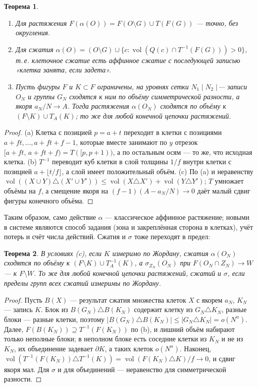 \documentclass[11pt,a4paper]{article}
\theoremstyle{plain}
\newtheorem{theorem}{Теорема}
\theoremstyle{definition}
\theoremstyle{remark}
\DeclareMathOperator{\vol}{vol}
\begin{document}
\begin{theorem}\label{thm:affine}
\begin{enumerate}[label=\upshape(\alph*)]
\item Для растяжения $F(\alpha(O))=F(O\setminus G)\cup T(F(G))$ — точно, без округления.
\item Для сжатия $\alpha(O)=(O\setminus G)\cup\{c: \vol(Q(c)\cap T^{-1}(F(G)))>0\}$, т.\,е. клеточное сжатие есть аффинное сжатие с последующей записью «клетка занята, если задета».
\item Пусть фигуры $F$ и $K\subset F$ ограничены, на уровнях сетки $N_1\mid N_2\mid\cdots$ записи $O_N$ и группы $G_N$ сходятся к ним по объёму симметрической разности, а якоря $a_N/N\to A$. Тогда растяжения $\alpha(O_N)$ сходятся по объёму к $(F\setminus K)\cup T_A(K)$; то же для любой конечной цепочки растяжений.
\end{enumerate}
\end{theorem}
\begin{proof}
(a) Клетка с позицией $p=a+t$ переходит в клетки с позициями $a+ft,\dots,a+ft+f-1$, которые вместе занимают по $y$ отрезок $[a+ft,\,a+ft+f)=T([p,p+1))$, а по остальным осям — то же, что исходная клетка. (b) $T^{-1}$ переводит куб клетки в слой толщины $1/f$ внутри клетки с позицией $a+\lfloor t/f\rfloor$, а слой имеет положительный объём. (c) По (a) и неравенству $\vol((X\cup Y)\triangle(X'\cup Y'))\le\vol(X\triangle X')+\vol(Y\triangle Y')$; $T$ умножает объёмы на $f$, а смещение якоря на $(f-1)(A-a_N/N)\to0$ даёт малый сдвиг фигуры конечного объёма.
\end{proof}

Таким образом, само действие $\alpha$ — классическое аффинное растяжение; новыми в системе являются способ задания (зона и закреплённая сторона в клетках), учёт потерь и счёт числа действий. Сжатия и $\sigma$ тоже переходят в предел:

\begin{theorem}\label{thm:limit}
В условиях (c), если $K$ измеримо по Жордану, сжатия $\alpha(O_N)$ сходятся по объёму к $(F\setminus K)\cup T_A^{-1}(K)$, а $\sigma_{Z_N}(O_N)$ при $F(O_N\cap Z_N)\to W$ — к $F\setminus W$. То же для любой конечной цепочки растяжений, сжатий и $\sigma$, если пределы групп всех сжатий измеримы по Жордану.
\end{theorem}
\begin{proof}
Пусть $B(X)$ — результат сжатия множества клеток $X$ с якорем $a_N$, $K_N$ — запись $K$. Блок из $B(G_N)\triangle B(K_N)$ содержит клетку из $G_N\triangle K_N$, разные блоки — разные клетки, поэтому $|B(G_N)\triangle B(K_N)|\le|G_N\triangle K_N|=o(N^n)$. Далее, $F(B(K_N))\supseteq T^{-1}(F(K_N))$ по (b), и лишний объём набирают только неполные блоки; в неполном блоке есть соседние клетки из $K_N$ и не из $K_N$, их объединение задевает $\partial K$, а таких клеток $o(N^n)$. Наконец, $\vol(T^{-1}(F(K_N))\triangle T^{-1}(K))=\vol(F(K_N)\triangle K)/f\to0$, и сдвиг якоря мал. Для $\sigma$ и для объединений — неравенство для симметрической разности.
\end{proof}
\end{document}
